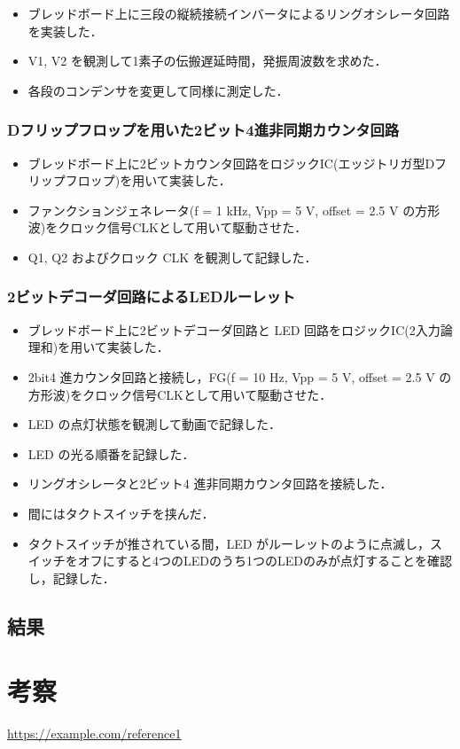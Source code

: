 \documentclass{ltjsarticle}
\begin{document}
\begin{itemize}
  \item ブレッドボード上に三段の縦続接続インバータによるリングオシレータ回路を実装した．
  \item V1, V2 を観測して1素子の伝搬遅延時間，発振周波数を求めた．
  \item 各段のコンデンサを変更して同様に測定した．
\end{itemize}

\subsubsection{Dフリップフロップを用いた2ビット4進非同期カウンタ回路}
\begin{itemize}
  \item ブレッドボード上に2ビットカウンタ回路をロジックIC(エッジトリガ型Dフリップフロップ)を用いて実装した．
  \item ファンクションジェネレータ(f = 1 kHz, Vpp = 5 V, offset = 2.5 V の方形波)をクロック信号CLKとして用いて駆動させた．
  \item Q1, Q2 およびクロック CLK を観測して記録した．
\end{itemize}

\subsubsection{2ビットデコーダ回路によるLEDルーレット}
\begin{itemize}
  \item ブレッドボード上に2ビットデコーダ回路と LED 回路をロジックIC(2入力論理和)を用いて実装した．
  \item 2bit4 進カウンタ回路と接続し，FG(f = 10 Hz, Vpp = 5 V, offset = 2.5 V の方形波)をクロック信号CLKとして用いて駆動させた．
  \item LED の点灯状態を観測して動画で記録した．
  \item LED の光る順番を記録した．
\end{itemize}

\begin{itemize}
  \item リングオシレータと2ビット4 進非同期カウンタ回路を接続した．
  \item 間にはタクトスイッチを挟んだ．
  \item タクトスイッチが推されている間，LED がルーレットのように点滅し，スイッチをオフにすると4つのLEDのうち1つのLEDのみが点灯することを確認し，記録した．
\end{itemize}
\subsection{結果}

\section{考察}

\begin{thebibliography}{9}
 \url{https://example.com/reference1}
\end{thebibliography}
\end{document}
